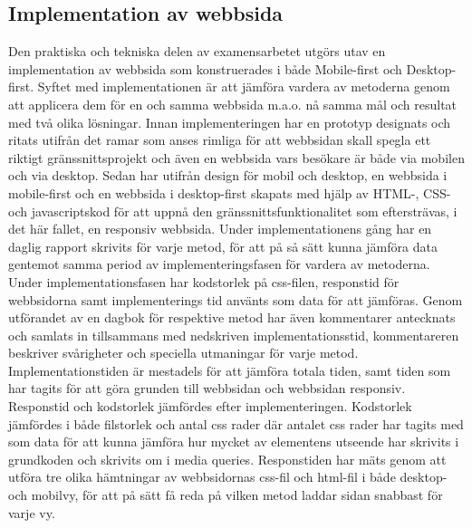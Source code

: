 \documentclass[11pt]{article}
\begin{document}
\subsection{Implementation av webbsida}
Den praktiska och tekniska delen av examensarbetet utgörs utav en implementation av webbsida som konstruerades i både Mobile-first och Desktop-first. Syftet med implementationen är att jämföra vardera av metoderna genom att applicera dem för en och samma webbsida m.a.o. nå samma mål och resultat med två olika lösningar. Innan implementeringen har en prototyp designats och ritats utifrån det ramar som anses rimliga för att webbsidan skall spegla ett riktigt gränssnittsprojekt och även en webbsida vars besökare är både via mobilen och via desktop. Sedan har utifrån design för mobil och desktop, en webbsida i mobile-first och en webbsida i desktop-first skapats med hjälp av HTML-, CSS- och javascriptskod för att uppnå den gränssnittsfunktionalitet som eftersträvas, i det här fallet, en responsiv webbsida. Under implementationens gång har en daglig rapport skrivits för varje metod, för att på så sätt kunna jämföra data gentemot samma period av implementeringsfasen för vardera av metoderna. Under implementationsfasen har kodstorlek på css-filen, responstid för webbsidorna samt implementerings tid använts som data för att jämföras. Genom utförandet av en dagbok för respektive metod har även kommentarer antecknats och samlats in tillsammans med nedskriven implementationsstid, kommentareren beskriver svårigheter och speciella utmaningar för varje metod. Implementationstiden är mestadels för att jämföra totala tiden, samt tiden som har tagits för att göra grunden till webbsidan och webbsidan responsiv. Responstid och kodstorlek jämfördes efter implementeringen. Kodstorlek jämfördes i både filstorlek och antal css rader där antalet css rader har tagits med som data för att kunna jämföra hur mycket av elementens utseende har skrivits i grundkoden och skrivits om i media queries. Responstiden har mäts genom att utföra tre olika hämtningar av webbsidornas css-fil och html-fil i både desktop- och mobilvy, för att på sätt få reda på vilken metod laddar sidan snabbast för varje vy.
  
\end{document}

